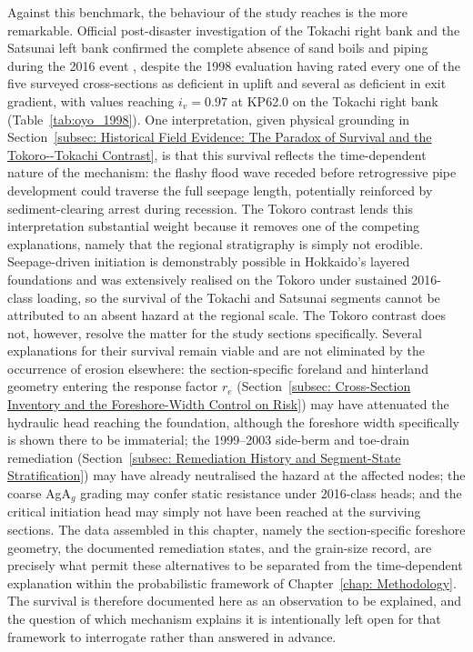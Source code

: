 Against this benchmark, the behaviour of the study reaches is the more remarkable. Official post-disaster investigation of the Tokachi right bank and the Satsunai left bank confirmed the complete absence of sand boils and piping during the 2016 event \parencite{tokachi_levee_committee_2017}, despite the 1998 evaluation having rated every one of the five surveyed cross-sections as deficient in uplift and several as deficient in exit gradient, with values reaching $i_v = 0.97$ at KP62.0 on the Tokachi right bank (Table~\ref{tab:oyo_1998}). One interpretation, given physical grounding in Section~\ref{subsec: Historical Field Evidence: The Paradox of Survival and the Tokoro--Tokachi Contrast}, is that this survival reflects the time-dependent nature of the mechanism: the flashy flood wave receded before retrogressive pipe development could traverse the full seepage length, potentially reinforced by sediment-clearing arrest during recession. The Tokoro contrast lends this interpretation substantial weight because it removes one of the competing explanations, namely that the regional stratigraphy is simply not erodible. Seepage-driven initiation is demonstrably possible in Hokkaido's layered foundations and was extensively realised on the Tokoro under sustained 2016-class loading, so the survival of the Tokachi and Satsunai segments cannot be attributed to an absent hazard at the regional scale. The Tokoro contrast does not, however, resolve the matter for the study sections specifically. Several explanations for their survival remain viable and are not eliminated by the occurrence of erosion elsewhere: the section-specific foreland and hinterland geometry entering the response factor $r_e$ (Section~\ref{subsec: Cross-Section Inventory and the Foreshore-Width Control on Risk}) may have attenuated the hydraulic head reaching the foundation, although the foreshore width specifically is shown there to be immaterial; the 1999--2003 side-berm and toe-drain remediation (Section~\ref{subsec: Remediation History and Segment-State Stratification}) may have already neutralised the hazard at the affected nodes; the coarse AgA$_g$ grading may confer static resistance under 2016-class heads; and the critical initiation head may simply not have been reached at the surviving sections. The data assembled in this chapter, namely the section-specific foreshore geometry, the documented remediation states, and the grain-size record, are precisely what permit these alternatives to be separated from the time-dependent explanation within the probabilistic framework of Chapter~\ref{chap: Methodology}. The survival is therefore documented here as an observation to be explained, and the question of which mechanism explains it is intentionally left open for that framework to interrogate rather than answered in advance.

